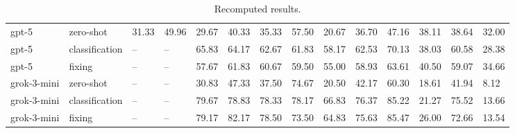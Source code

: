 \begin{table}[!t]
\begin{tabular}{llllllllllllll}
gpt-5 & zero-shot & 31.33 & 49.96 & 29.67 & 40.33 & 35.33 & 57.50 & 20.67 & 36.70 & 47.16 & 38.11 & 38.64 & 32.00 \\
gpt-5 & classification & -- & -- & 65.83 & 64.17 & 62.67 & 61.83 & 58.17 & 62.53 & 70.13 & 38.03 & 60.58 & 28.38 \\
gpt-5 & fixing & -- & -- & 57.67 & 61.83 & 60.67 & 59.50 & 55.00 & 58.93 & 63.61 & 40.50 & 59.07 & 34.66 \\
grok-3-mini & zero-shot & -- & -- & 30.83 & 47.33 & 37.50 & 74.67 & 20.50 & 42.17 & 60.30 & 18.61 & 41.94 & 8.12 \\
grok-3-mini & classification & -- & -- & 79.67 & 78.83 & 78.33 & 78.17 & 66.83 & 76.37 & 85.22 & 21.27 & 75.52 & 13.66 \\
grok-3-mini & fixing & -- & -- & 79.17 & 82.17 & 78.50 & 73.50 & 64.83 & 75.63 & 85.47 & 26.00 & 72.66 & 13.54 \\
\bottomrule
\end{tabular}
\caption{Recomputed results.}
\label{tab:consistency_per_action_by_id}
\end{table}
